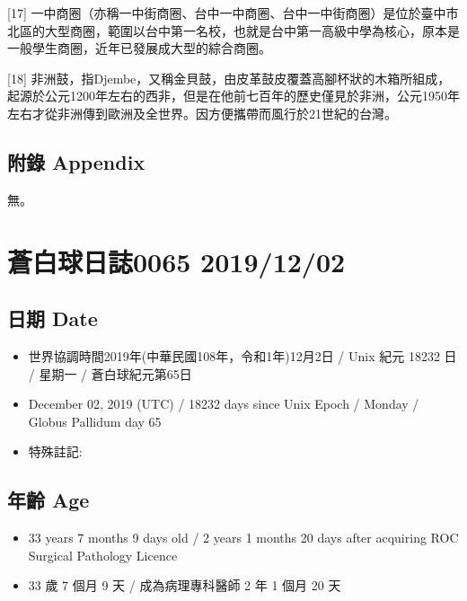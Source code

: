 \documentclass[a5paper, 12pt
]{book}
\providecommand{\tightlist}{%
  \setlength{\itemsep}{0pt}\setlength{\parskip}{0pt}}
\begin{document}
{[}17{]}
一中商圈（亦稱一中街商圈、台中一中商圈、台中一中街商圈）是位於臺中市北區的大型商圈，範圍以台中第一名校，也就是台中第一高級中學為核心，原本是一般學生商圈，近年已發展成大型的綜合商圈。

{[}18{]}
非洲鼓，指Djembe，又稱金貝鼓，由皮革鼓皮覆蓋高腳杯狀的木箱所組成，起源於公元1200年左右的西非，但是在他前七百年的歷史僅見於非洲，公元1950年左右才從非洲傳到歐洲及全世界。因方便攜帶而風行於21世紀的台灣。

\hypertarget{ux9644ux9304-appendix}{%
\subsection{附錄 Appendix}\label{ux9644ux9304-appendix}}

無。

\hypertarget{ux84bcux767dux7403ux65e5ux8a8c0065-20191202}{%
\section{蒼白球日誌0065
2019/12/02}\label{ux84bcux767dux7403ux65e5ux8a8c0065-20191202}}

\hypertarget{ux65e5ux671f-date-1}{%
\subsection{日期 Date}\label{ux65e5ux671f-date-1}}

\begin{itemize}
\tightlist
\item
  世界協調時間2019年(中華民國108年，令和1年)12月2日 / Unix 紀元 18232 日
  / 星期一 / 蒼白球紀元第65日
\item
  December 02, 2019 (UTC) / 18232 days since Unix Epoch / Monday /
  Globus Pallidum day 65
\item
  特殊註記:
\end{itemize}

\hypertarget{ux5e74ux9f61-age-1}{%
\subsection{年齡 Age}\label{ux5e74ux9f61-age-1}}

\begin{itemize}
\tightlist
\item
  33 years 7 months 9 days old / 2 years 1 months 20 days after
  acquiring ROC Surgical Pathology Licence
\item
  33 歲 7 個月 9 天 / 成為病理專科醫師 2 年 1 個月 20 天
\end{itemize}
\end{document}
